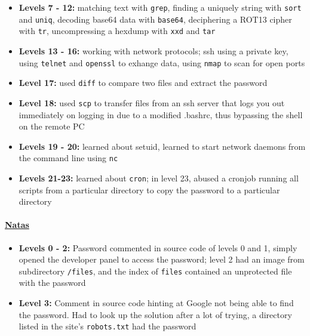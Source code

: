 \documentclass{article}
\def\code#1{\texttt{#1}}
\begin{document}
\begin{itemize}
\begin{itemize}
    \item \textbf{Levels 7 - 12: } matching text with \code{grep}, finding a uniquely string with \code{sort} and \code{uniq}, decoding base64 data with \code{base64}, deciphering a ROT13 cipher with \code{tr}, uncompressing a hexdump with \code{xxd} and \code{tar}
    
    \item \textbf{Levels 13 - 16: } working with network protocols; ssh using a private key, using \code{telnet} and \code{openssl} to exhange data, using \code{nmap} to scan for open ports
    
    \item \textbf{Level 17: } used \code{diff} to compare two files and extract the password
    
    \item \textbf{Level 18: } used \code{scp} to transfer files from an ssh server that logs you out immediately on logging in due to a modified .bashrc, thus bypassing the shell on the remote PC
    
    \item \textbf{Levels 19 - 20: } learned about setuid, learned to start network daemons from the command line using \code{nc}
    
    \item \textbf{Levels 21-23: } learned about \code{cron}; in level 23, abused a cronjob running all scripts from a particular directory to copy the password to a particular directory

\end{itemize}

\paragraph{\href{http://overthewire.org/wargames/bandit}{Natas}}

\begin{itemize}
    
    \item \textbf{Levels 0 - 2: } Password commented in source code of levels 0 and 1, simply opened the developer panel to access the password; level 2 had an image from subdirectory \code{/files}, and the index of \code{files} contained an unprotected file with the password
    
    \item \textbf{Level 3: } Comment in source code hinting at Google not being able to find the password. Had to look up the solution after a lot of trying, a directory listed in the site's \code{robots.txt} had the password
    

\end{itemize}
\end{itemize}
\end{document}
